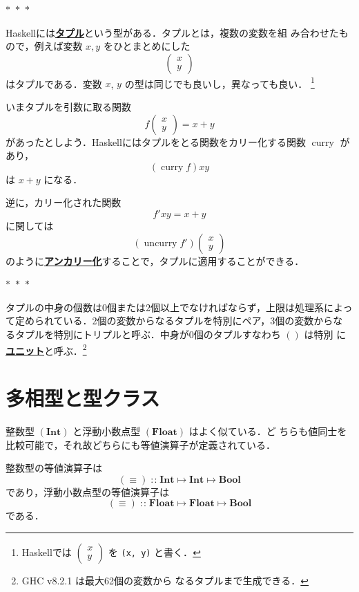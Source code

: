 \documentclass[a5paper,twoside,fleqn,draft]{jsbook}
\newcommand{\separator}{\begin{center}$*$~$*$~$*$\end{center}}
\newcommand{\programminglanguage}[1]{\textsf{#1}}
\newcommand{\haskell}{\programminglanguage{Haskell}}
\newcommand{\keyword}[1]{{\underline{\textbf{#1}}}}
\newcommand{\code}[1]{\texttt{#1}}
\newcommand{\mSpecialFunc}[1]{#1}
\DeclareMathOperator{\mCurry}{\mSpecialFunc{curry}}
\DeclareMathOperator{\mUncurry}{\mSpecialFunc{uncurry}}
\DeclareMathOperator{\mIn}{{:\!:}}
\DeclareMathOperator{\mMapsTo}{\mapsto}
\newcommand{\mType}[1]{\mathbf{#1}} %
\newcommand{\mBoolType}{\mType{Bool}}
\newcommand{\mFloatType}{\mType{Float}}
\newcommand{\mIntType}{\mType{Int}}
\newcommand{\mPairWith}[2]{\begin{pmatrix}#1\\#2\end{pmatrix}}
\begin{document}
\separator

\haskell には\keyword{タプル}という型がある．タプルとは，複数の変数を組
み合わせたもので，例えば変数 $x,y$ をひとまとめにした
\begin{equation}
  \mPairWith{x}{y}
\end{equation}
はタプルである．変数 $x$, $y$ の型は同じでも良いし，異なっても良い．
\footnote{\haskell では $\mPairWith{x}{y}$ を \code{(x, y)} と書く．}

いまタプルを引数に取る関数
\begin{equation}
  f\mPairWith{x}{y}
  =x+y
\end{equation}
があったとしよう．\haskell にはタプルをとる関数をカリー化する関数
$\mCurry$ があり，
\begin{equation}
  (\mCurry f)xy
\end{equation}
は $x+y$ になる．

逆に，カリー化された関数
\begin{equation}
  f'xy
  =x+y
\end{equation}
に関しては
\begin{equation}
  (\mUncurry f')\mPairWith{x}{y}
\end{equation}
のように\keyword{アンカリー化}することで，タプルに適用することができる．

\separator

タプルの中身の個数は0個または2個以上でなければならず，上限は処理系によっ
て定められている．2個の変数からなるタプルを特別にペア，3個の変数からな
るタプルを特別にトリプルと呼ぶ．中身が0個のタプルすなわち $()$ は特別
に\keyword{ユニット}と呼ぶ．\footnote{GHC v8.2.1 は最大62個の変数から
  なるタプルまで生成できる．}

\section{多相型と型クラス}

整数型 $(\mIntType)$ と浮動小数点型 $(\mFloatType)$ はよく似ている．ど
ちらも値同士を比較可能で，それ故どちらにも等値演算子が定義されている．

整数型の等値演算子は
\begin{equation}
  (\equiv)
  \mIn\mIntType\mMapsTo\mIntType\mMapsTo\mBoolType
\end{equation}
であり，浮動小数点型の等値演算子は
\begin{equation}
  (\equiv)
  \mIn\mFloatType\mMapsTo\mFloatType\mMapsTo\mBoolType
\end{equation}
である．
\end{document}
